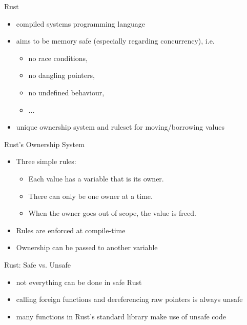 \documentclass[NET,english,aspectratio=169,notitleframe,draft]{tumbeamer}
\begin{document}
\begin{frame}{Rust}
\begin{itemize}
\item compiled systems programming language
\item aims to be memory safe (especially regarding concurrency), i.e.
\begin{itemize}
\item no race conditions,
\item no dangling pointers,
\item no undefined behaviour,
\item ...
\end{itemize}
\item unique ownership system and ruleset for moving/borrowing values
\end{itemize}
\end{frame}

\begin{frame}{Rust's Ownership System}
\begin{itemize}
\item Three simple rules:
\begin{itemize}
\item Each value has a variable that is its owner.
\item There can only be one owner at a time.
\item When the owner goes out of scope, the value is freed.
\end{itemize}
\item Rules are enforced at compile-time
\item Ownership can be passed to another variable%
\end{itemize}
\end{frame}

\begin{frame}{Rust: Safe vs. Unsafe}
\begin{itemize}
\item not everything can be done in safe Rust
\item calling foreign functions and dereferencing raw pointers is always unsafe
\item many functions in Rust's standard library make use of unsafe code
\end{itemize}
\end{frame}
\end{document}
